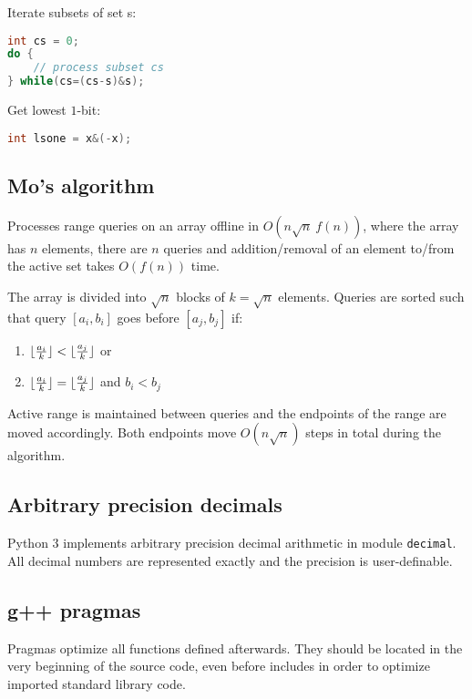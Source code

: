 \documentclass{article}
\DeclarePairedDelimiter\floor{\lfloor}{\rfloor} %
\begin{document}
Iterate subsets of set s:
\begin{lstlisting}[language=C++]
int cs = 0;
do {
	// process subset cs
} while(cs=(cs-s)&s);
\end{lstlisting}

Get lowest $1$-bit:
\begin{lstlisting}[language=C++]
int lsone = x&(-x);
\end{lstlisting}

\subsection{Mo's algorithm}

Processes range queries on an array offline in $O(n\sqrt{n} \ f(n))$, where the array has $n$ elements, there are $n$ queries and addition/removal of an element to/from the active set takes $O(f(n))$ time.

The array is divided into $\sqrt{n}$ blocks of $k = \sqrt{n}$ elements. Queries are sorted such that query $[a_i, b_i]$ goes before $[a_j, b_j]$ if:

\begin{enumerate}
	\item $\floor{\frac{a_i}{k}} < \floor{\frac{a_j}{k}}$ or
	\item $\floor{\frac{a_i}{k}} = \floor{\frac{a_j}{k}}$ and $b_i < b_j$
\end{enumerate}

Active range is maintained between queries and the endpoints of the range are moved accordingly. Both endpoints move $O(n\sqrt{n})$ steps in total during the algorithm.

\subsection {Arbitrary precision decimals}

Python 3 implements arbitrary precision decimal arithmetic in module \texttt{decimal}. All decimal numbers are represented exactly and the precision is user-definable.



\subsection {g++ pragmas}

Pragmas optimize all functions defined afterwards. They should be located in the very beginning of the source code, even before includes in order to optimize imported standard library code.
\end{document}
